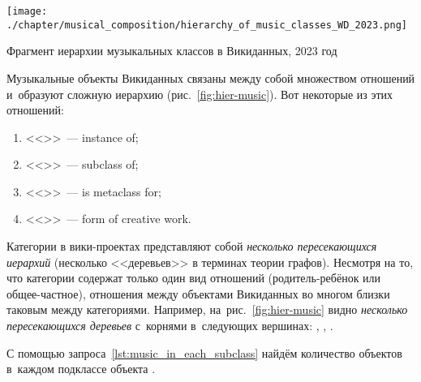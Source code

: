 

\begin{marginfigure}[0\baselineskip]
	\texttt{[image: ./chapter/musical\_composition/hierarchy\_of\_music\_classes\_WD\_2023.png]}
	\caption[Иерархия музыкальных классов]{Фрагмент иерархии музыкальных классов в Викиданных, 2023 год}%
	\label{fig:hier-music}%
\end{marginfigure}
%
Музыкальные объекты Викиданных связаны между собой множеством отношений 
и~образуют сложную иерархию (рис.~\ref{fig:hier-music}). 
Вот некоторые из этих отношений: 
\begin{enumerate}
        \item <<>>~--- instance of;
        \item <<>>~--- subclass of;
        \item <<>>~--- is metaclass for;
        \item <<>>~--- form of creative work.
\end{enumerate}

Категории в вики-проектах представляют собой \emph{несколько пересекающихся иерархий} 
(несколько <<деревьев>> в терминах теории графов). 
Несмотря на то, что категории содержат только один вид отношений 
(родитель-ребёнок или общее-частное), 
отношения между объектами Викиданных во многом близки таковым между категориями. 
Например, на~рис.~\ref{fig:hier-music} видно 
\emph{несколько пересекающихся деревьев} с~корнями в~следующих вершинах:  
        , 
        , 
        .


С помощью запроса~\ref{lst:music_in_each_subclass} найдём количество объектов 
в~каждом подклассе объекта . 


